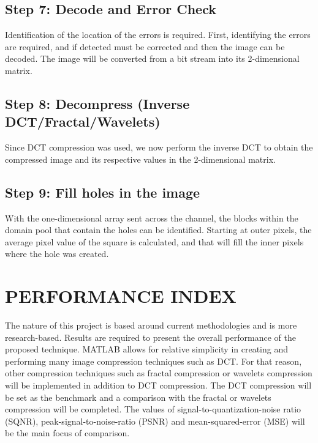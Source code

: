 \documentclass[10pt,twocolumn, a4paper]{witseiepaper}
\begin{document}
\subsection{Step 7: Decode and Error Check}
\label{sec: Step 7}
Identification of the location of the errors is required. First, identifying the errors are required, and if detected must be corrected and then the image can be decoded. The image will be converted from a bit stream into its 2-dimensional matrix.

\subsection{Step 8: Decompress (Inverse DCT/Fractal/Wavelets)}
\label{sec: Step 8}
Since DCT compression was used, we now perform the inverse DCT to obtain the compressed image and its respective values in the 2-dimensional matrix.

\subsection{Step 9: Fill holes in the image}
\label{sec: Step 9}
With the one-dimensional array sent across the channel, the blocks within the domain pool that contain the holes can be identified. Starting at outer pixels, the average pixel value of the square is calculated, and that will fill the inner pixels where the hole was created.

%
\section{PERFORMANCE INDEX}
\label{sec: Performance Index}
The nature of this project is based around current methodologies and is more research-based. Results are required to present the overall performance of the proposed technique. MATLAB allows for relative simplicity in creating and performing many image compression techniques such as DCT. For that reason, other compression techniques such as fractal compression or wavelets compression will be implemented in addition to DCT compression. The DCT compression will be set as the benchmark and a comparison with the fractal or wavelets compression will be completed. The values of signal-to-quantization-noise ratio (SQNR), peak-signal-to-noise-ratio (PSNR) and mean-squared-error (MSE) will be the main focus of comparison.

%
\end{document}
